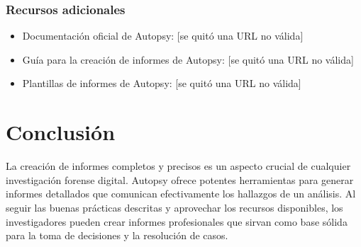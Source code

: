 \documentclass{article}
\begin{document}
\subsubsection{Recursos adicionales}
\begin{itemize}
    \item
    Documentación oficial de Autopsy: [se quitó una URL no válida]
    \item
    Guía para la creación de informes de Autopsy: [se quitó una URL no válida]
    \item
    Plantillas de informes de Autopsy: [se quitó una URL no válida]
\end{itemize}

\section*{Conclusión}
La creación de informes completos y precisos es un aspecto
crucial de cualquier investigación forense digital.
Autopsy ofrece potentes herramientas para generar
informes detallados que comunican efectivamente los
hallazgos de un análisis. Al seguir las buenas prácticas
descritas y aprovechar los recursos disponibles, los
investigadores pueden crear informes profesionales que
sirvan como base sólida para la toma de decisiones y la
resolución de casos.
\end{document}
